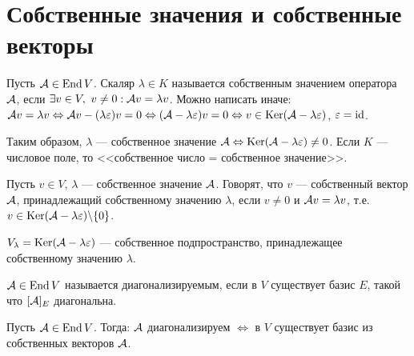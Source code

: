 \documentclass[main]{subfiles}
\begin{document}
\chapter{Собственные значения и собственные векторы}

Пусть $\mathcal{A} \in \operatorname{End} V$. Скаляр $\lambda \in K$ называется собственным значением оператора
$\mathcal{A}$, если $\exists v \in V,\ v \neq 0 : \mathcal{A} v = \lambda v$.
Можно написать иначе: $\mathcal{A} v = \lambda v \Leftrightarrow \mathcal{A} v - (\lambda \varepsilon) v = 0
    \Leftrightarrow (\mathcal{A} -\lambda\varepsilon)v = 0
    \Leftrightarrow v \in \operatorname{Ker}(\mathcal{A} -\lambda\varepsilon)$, $\varepsilon = \mathrm{id}$.

\begin{definition} 
    Таким образом, $\lambda$  —  собственное значение $\mathcal{A}
        \Leftrightarrow  \operatorname{Ker}(\mathcal{A} -\lambda\varepsilon) \neq 0$.
    Если $K$ — числовое поле, то <<собственное число = собственное значение>>.
\end{definition}

\begin{definition} 
    Пусть $v \in V$, $\lambda$ — собственное значение $\mathcal{A}$.
    Говорят, что $v$ — собственный вектор $\mathcal{A}$, принадлежащий собственному значению
    $\lambda$, если $v \neq 0$ и $\mathcal{A} v = \lambda v$,
    т.е. $v \in \operatorname{Ker} (\mathcal{A} - \lambda \varepsilon) \backslash  \{0\}$.
\end{definition}

\begin{definition} 
    $V_\lambda = \operatorname{Ker}(\mathcal{A} - \lambda \varepsilon)$ —
    собственное подпространство, принадлежащее собственному значению $\lambda$.
\end{definition}

\begin{definition} 
    $\mathcal{A}  \in \operatorname{End} V$ называется диагонализируемым, если в $V$ существует
    базис $E$, такой что $[\mathcal{A}]_E$ диагональна.
\end{definition}

\begin{proposition}
    Пусть $\mathcal{A} \in \operatorname{End} V$. Тогда: $\mathcal{A}$ диагонализируем
    $\Leftrightarrow$ в $V$ существует базис из собственных векторов $\mathcal{A}$.
\end{proposition}
\end{document}
